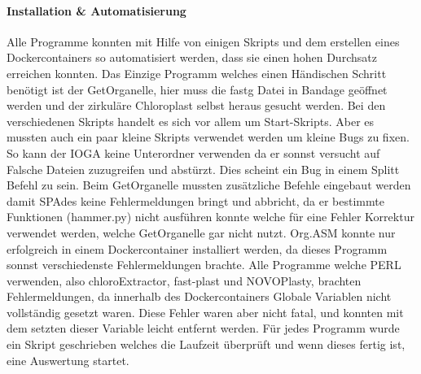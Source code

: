\documentclass{scrartcl}
\begin{document}
\paragraph{Installation \& Automatisierung}
\label{sec-3-1-2-1}
Alle Programme konnten mit Hilfe von einigen Skripts und dem erstellen eines Dockercontainers so 
automatisiert werden, dass sie einen hohen Durchsatz erreichen konnten. Das Einzige Programm welches
einen Händischen Schritt benötigt ist der GetOrganelle, hier muss die fastg Datei in Bandage
geöffnet werden und der zirkuläre Chloroplast selbst heraus gesucht werden.
Bei den verschiedenen Skripts handelt es sich vor allem um Start-Skripts. Aber es mussten auch ein paar 
kleine Skripts verwendet werden um kleine Bugs zu fixen. So kann der IOGA keine Unterordner verwenden da er sonnst
versucht auf Falsche Dateien zuzugreifen und abstürzt. Dies scheint ein Bug in einem Splitt Befehl zu sein. Beim GetOrganelle mussten
zusätzliche Befehle eingebaut werden damit SPAdes keine Fehlermeldungen bringt und abbricht, da er bestimmte Funktionen (hammer.py) nicht ausführen konnte
welche für eine Fehler Korrektur verwendet werden, welche GetOrganelle gar nicht nutzt. Org.ASM konnte nur erfolgreich in einem Dockercontainer
installiert werden, da dieses Programm sonnst verschiedenste Fehlermeldungen brachte. Alle Programme welche PERL verwenden, also
chloroExtractor, fast-plast und NOVOPlasty, brachten Fehlermeldungen, da innerhalb des Dockercontainers Globale Variablen nicht vollständig gesetzt waren. 
Diese Fehler waren aber nicht fatal, und konnten mit dem setzten dieser Variable leicht entfernt werden. 
Für jedes Programm wurde ein Skript geschrieben welches die Laufzeit überprüft und wenn dieses fertig ist, eine Auswertung startet.
\end{document}
